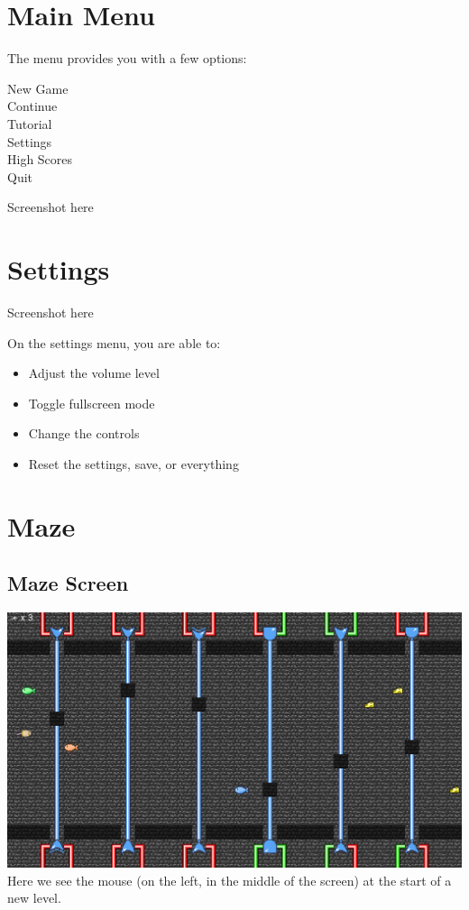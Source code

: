 \documentclass[12pt]{book}
\begin{document}
	\chapter{Main Menu}
		The menu provides you with a few options:
		\begin{description}
			\item[New Game]
			\item[Continue]
			\item[Tutorial]
			\item[Settings]
			\item[High Scores]
			\item[Quit]
		\end{description}
		\newpage
		\begin{center}
			\vspace{2cm}
			\Huge
			Screenshot here		
		\end{center}
	\chapter{Settings}
		\begin{center}
			\vspace{2cm}
			\Huge
			Screenshot here		
		\end{center}
		On the settings menu, you are able to:
		\begin{itemize}
			\item Adjust the volume level
			\item Toggle fullscreen mode
			\item Change the controls
			\item Reset the settings, save, or everything
		\end{itemize}
	\chapter{Maze}
		\section{Maze Screen}
			\includegraphics[width=\textwidth]{MazeScreenshot}
			\\
			Here we see the mouse (on the left, in the middle of the screen) at the start of a new level.
\end{document}
